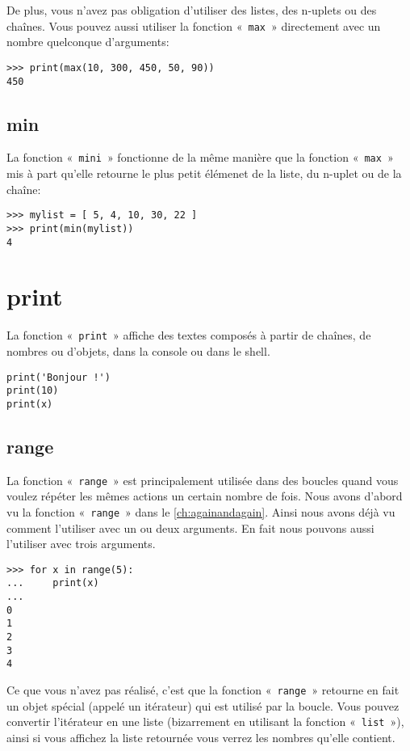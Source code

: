 De plus, vous n'avez pas obligation d'utiliser des listes, des n-uplets ou des chaînes. Vous pouvez aussi utiliser la fonction «~\texttt{max}~» directement avec un nombre quelconque d'arguments:
\begin{Verbatim}[frame=single,rulecolor=\color{gray}]
>>> print(max(10, 300, 450, 50, 90))
450
\end{Verbatim}

\subsection*{min}
La fonction «~\texttt{mini}~» fonctionne de la même manière que la fonction «~\texttt{max}~» mis à part qu'elle retourne le plus petit élémenet de la liste, du n-uplet ou de la chaîne:
\begin{Verbatim}[frame=single,rulecolor=\color{gray}]
>>> mylist = [ 5, 4, 10, 30, 22 ]
>>> print(min(mylist))
4
\end{Verbatim}

\section*{print}
La fonction «~\texttt{print}~» affiche des textes composés à partir de chaînes, de nombres ou d'objets, dans la console ou dans le shell. 
\begin{Verbatim}[frame=single,rulecolor=\color{gray}]
print('Bonjour !')
print(10)
print(x)
\end{Verbatim}

\subsection*{range}

La fonction «~\texttt{range}~» est principalement utilisée dans des boucles quand vous voulez répéter les mêmes actions un certain nombre de fois.  Nous avons d'abord vu la fonction «~\texttt{range}~» dans le \autoref{ch:againandagain}. Ainsi nous avons déjà vu comment l'utiliser avec un ou deux arguments. En fait nous pouvons aussi l'utiliser avec trois arguments.

\begin{Verbatim}[frame=single,rulecolor=\color{gray}]
>>> for x in range(5):
...     print(x)
... 
0
1
2
3
4
\end{Verbatim}

Ce que vous n'avez pas réalisé, c'est que la fonction «~\texttt{range}~» retourne en fait un objet spécial (appelé un itérateur) qui est utilisé par la boucle. Vous pouvez convertir l'itérateur en une liste (bizarrement en utilisant la fonction «~\texttt{list}~»), ainsi si vous affichez la liste retournée vous verrez les nombres qu'elle contient.  

